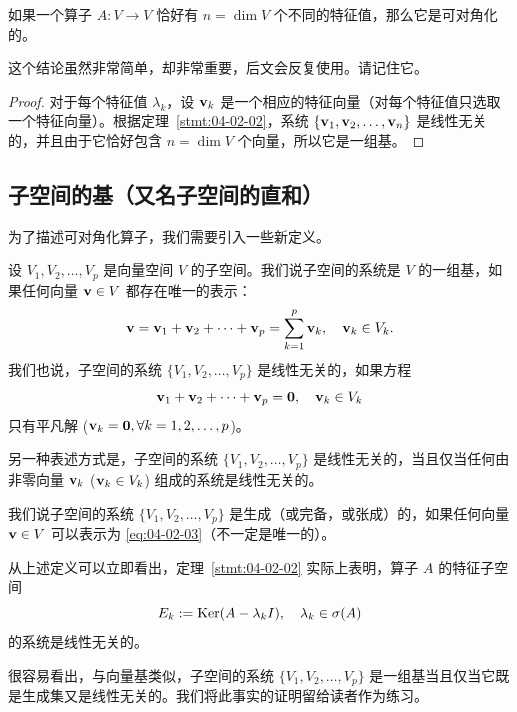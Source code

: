\begin{corollary}\label{stmt:04-02-03}
如果一个算子 $A: V \to V$ 恰好有 $n = \dim V$ 个不同的特征值，那么它是可对角化的。
\end{corollary}

这个结论虽然非常简单，却非常重要，后文会反复使用。请记住它。

\begin{proof}对于每个特征值 $\lambda_k$，设 $\mathbf{v}_k$ 是一个相应的特征向量（对每个特征值只选取一个特征向量）。根据定理~\ref{stmt:04-02-02}，系统 $\{\mathbf{v}_1, \mathbf{v}_2, \dots, \mathbf{v}_n\}$ 是线性无关的，并且由于它恰好包含 $n = \dim V$ 个向量，所以它是一组基。\end{proof}

\subsection{子空间的基（又名子空间的直和）}\label{sec:04-02-04}

为了描述可对角化算子，我们需要引入一些新定义。

设 $V_1, V_2, \dots, V_p$ 是向量空间 $V$ 的子空间。我们说子空间的系统是 $V$ 的一组基，如果任何向量 $\mathbf{v} \in V$ 都存在唯一的表示：
\begin{equation}\label{eq:04-02-03}
\mathbf{v} = \mathbf{v}_1 + \mathbf{v}_2 + \dots + \mathbf{v}_p = \sum_{k=1}^p \mathbf{v}_k,\quad \mathbf{v}_k \in V_k.
\end{equation}
我们也说，子空间的系统 $\{V_1, V_2, \dots, V_p\}$ 是线性无关的，如果方程
$$\mathbf{v}_1 + \mathbf{v}_2 + \dots + \mathbf{v}_p = \mathbf{0},\quad \mathbf{v}_k \in V_k$$
只有平凡解 ($\mathbf{v}_k = \mathbf{0}, \forall k = 1, 2, \dots, p$)。

另一种表述方式是，子空间的系统 $\{V_1, V_2, \dots, V_p\}$ 是线性无关的，当且仅当任何由非零向量 $\mathbf{v}_k$ ($\mathbf{v}_k \in V_k$) 组成的系统是线性无关的。

我们说子空间的系统 $\{V_1, V_2, \dots, V_p\}$ 是生成（或完备，或张成）的，如果任何向量 $\mathbf{v} \in V$ 可以表示为 \eqref{eq:04-02-03}（不一定是唯一的）。

\begin{remark}\label{stmt:04-02-04}
从上述定义可以立即看出，定理~\ref{stmt:04-02-02} 实际上表明，算子 $A$ 的特征子空间
$$E_k := \operatorname{Ker}(A - \lambda_k I),\quad \lambda_k \in \sigma(A)$$ 的系统是线性无关的。
\end{remark}

\begin{remark}\label{stmt:04-02-05}
很容易看出，与向量基类似，子空间的系统 $\{V_1, V_2, \dots, V_p\}$ 是一组基当且仅当它既是生成集又是线性无关的。我们将此事实的证明留给读者作为练习。
\end{remark}

